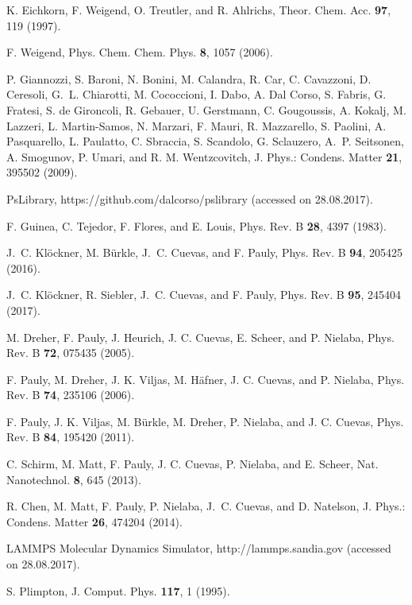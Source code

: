 \documentclass[aps,amsmath,amssymb,twocolumn,showpacs]{revtex4-1}
\begin{document}
\begin{thebibliography}{00}
K. Eichkorn, F. Weigend, O. Treutler, and R. Ahlrichs, Theor. Chem. Acc. {\bf 97}, 119 (1997).

F. Weigend, Phys. Chem. Chem. Phys. {\bf 8}, 1057 (2006).

P. Giannozzi, S. Baroni, N. Bonini, M. Calandra, R. Car, C. Cavazzoni, D. Ceresoli, 
G.~L. Chiarotti, M. Cococcioni, I. Dabo, A. Dal Corso, S. Fabris, G. Fratesi, S. de Gironcoli, 
R. Gebauer, U. Gerstmann, C. Gougoussis, A. Kokalj, M. Lazzeri, L. Martin-Samos, N. Marzari, 
F. Mauri, R. Mazzarello, S. Paolini, A. Pasquarello, L. Paulatto, C. Sbraccia, S. Scandolo, 
G. Sclauzero, A.~P. Seitsonen, A. Smogunov, P. Umari, and R. M. Wentzcovitch, 
J. Phys.: Condens. Matter {\bf 21}, 395502 (2009).

PsLibrary, https://github.com/dalcorso/pslibrary (accessed on 28.08.2017).

F. Guinea, C. Tejedor, F. Flores, and E. Louis, 
Phys. Rev. B {\bf 28}, 4397 (1983).

J.~C. Kl\"ockner, M. B\"urkle, J.~C. Cuevas, and F. Pauly, 
Phys. Rev. B {\bf 94}, 205425 (2016).

J.~C. Kl\"ockner, R. Siebler, J.~C. Cuevas, and F. Pauly, 
Phys. Rev. B {\bf 95}, 245404 (2017).

M. Dreher, F. Pauly, J. Heurich, J. C. Cuevas, E. Scheer, and P. Nielaba, 
Phys. Rev. B {\bf 72}, 075435 (2005).

F. Pauly, M. Dreher, J. K. Viljas, M. H\"afner, J. C. Cuevas, and P. Nielaba, 
Phys. Rev. B {\bf 74}, 235106 (2006).

F. Pauly, J. K. Viljas, M. B\"urkle, M. Dreher, P. Nielaba, and J. C. Cuevas,
Phys. Rev. B {\bf 84}, 195420 (2011).

C. Schirm, M. Matt, F. Pauly, J. C. Cuevas, P. Nielaba, and E. Scheer, 
Nat. Nanotechnol. {\bf 8}, 645 (2013).

R. Chen, M. Matt, F. Pauly, P. Nielaba, J.~C. Cuevas, and D. Natelson,
J. Phys.: Condens. Matter {\bf 26}, 474204 (2014).

LAMMPS Molecular Dynamics Simulator, http://lammps.sandia.gov (accessed on 28.08.2017).

S. Plimpton, J. Comput. Phys. {\bf 117}, 1 (1995).


\end{thebibliography}
\end{document}
